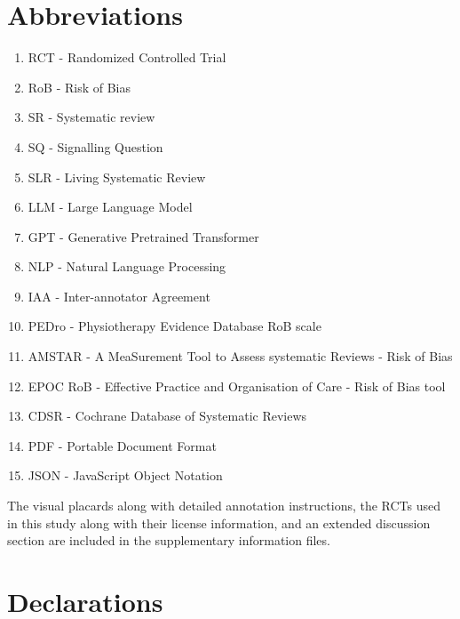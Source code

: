 \documentclass[sn-mathphys,Numbered]{sn-jnl}%
\theoremstyle{thmstyleone}%
\theoremstyle{thmstyletwo}%
\theoremstyle{thmstylethree}%
\begin{document}
\section{Abbreviations}%
%
\begin{enumerate}
    \item RCT - Randomized Controlled Trial
    \item RoB - Risk of Bias
    \item SR - Systematic review
    \item SQ - Signalling Question
    \item SLR - Living Systematic Review
    \item LLM - Large Language Model
    \item GPT - Generative Pretrained Transformer
    \item NLP - Natural Language Processing
    \item IAA - Inter-annotator Agreement
    \item PEDro - Physiotherapy Evidence Database RoB scale
    \item AMSTAR - A MeaSurement Tool to Assess systematic Reviews - Risk of Bias
    \item EPOC RoB - Effective Practice and Organisation of Care - Risk of Bias tool
    \item CDSR - Cochrane Database of Systematic Reviews
    \item PDF - Portable Document Format
    \item JSON - JavaScript Object Notation
\end{enumerate}
%
%
%
\backmatter

%
The visual placards along with detailed annotation instructions, the RCTs used in this study along with their license information, and an extended discussion section are included in the supplementary information files.
%
%
%


%
%
%
\section*{Declarations}
%
\end{document}
